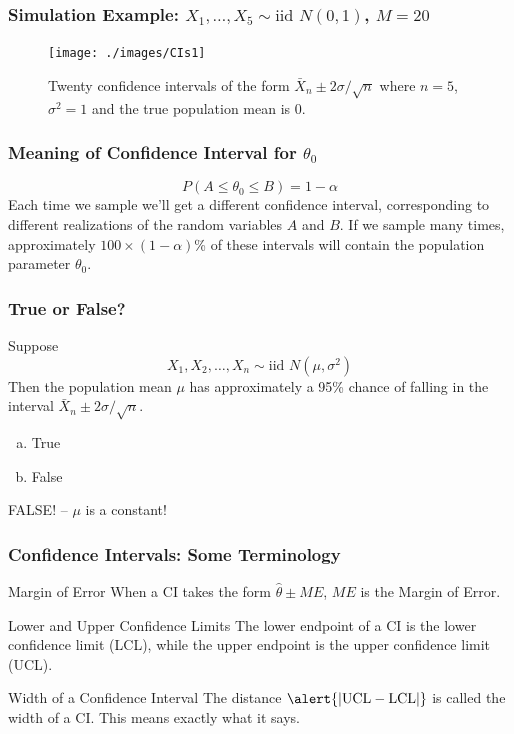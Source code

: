 \documentclass{beamer}
\begin{document}
\begin{frame}
\frametitle{Simulation Example: $X_1, \hdots, X_5 \sim \mbox{iid } N(0,1)$, $M = 20$}

\begin{figure}
\centering
\texttt{[image: ./images/CIs1]}
\caption{Twenty confidence intervals of the form $\bar{X}_n \pm 2 \sigma/\sqrt{n}$ where $n=5$, $\sigma^2 = 1$ and the true population mean is $0$.}
\end{figure}

\end{frame}

\begin{frame}
\frametitle{Meaning of Confidence Interval for $\theta_0$}
	$$\boxed{P(A\leq \theta_0 \leq B) = 1-\alpha}$$
Each time we sample we'll get a different confidence interval, corresponding to different realizations of the random variables $A$ and $B$. If we sample many times, approximately $100\times(1-\alpha)$\% of these intervals will contain the population parameter $\theta_0$.

\end{frame}

\begin{frame}
\frametitle{True or False? }
Suppose 
	$$\boxed{X_1, X_2, \hdots, X_n\sim \mbox{iid } N(\mu,\sigma^2)}$$
Then the population mean $\mu$ has approximately a 95\% chance of falling in the interval $\bar{X}_n \pm 2 \sigma/\sqrt{n}$.

\vspace{1em}

\begin{enumerate}[(a)]
\item True
\item False
\end{enumerate}


\pause
\vspace{1em}
\alert{\huge FALSE! -- $\mu$  is a constant!}


\end{frame}

\begin{frame}
\frametitle{Confidence Intervals: Some Terminology}
\begin{block}{Margin of Error}
When a CI takes the form $\widehat{\theta}\pm ME$, $ME$ is the Margin of Error. 
\end{block}
\pause
\begin{block}{Lower and Upper Confidence Limits}
The lower endpoint of a CI is the \alert{lower confidence limit (LCL)}, while the upper endpoint is the \alert{upper confidence limit (UCL)}.
\end{block}
\pause
\begin{block}{Width of a Confidence Interval}
The distance $\alert{|\mbox{UCL} - \mbox{LCL}|}$ is called the \alert{width} of a CI. This means exactly what it says. 
\end{block}

\end{frame}
\end{document}
